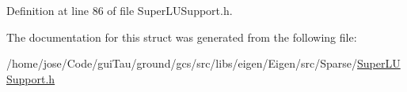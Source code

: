 Definition at line 86 of file Super\-L\-U\-Support.\-h.



The documentation for this struct was generated from the following file\-:\begin{DoxyCompactItemize}
\item 
/home/jose/\-Code/gui\-Tau/ground/gcs/src/libs/eigen/\-Eigen/src/\-Sparse/\hyperlink{_super_l_u_support_8h}{Super\-L\-U\-Support.\-h}\end{DoxyCompactItemize}
